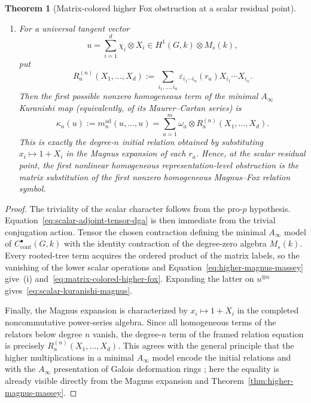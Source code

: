 \documentclass[11pt]{article}
\newtheorem{theorem}{Theorem}[section]
\theoremstyle{definition}
\begin{document}
\begin{theorem}[Matrix-colored higher Fox obstruction at a scalar residual point]
\begin{enumerate}[label=\textnormal{(\roman*)}]
\item For a universal tangent vector
\[
 u=\sum_{i=1}^{d}\chi_i\otimes X_i
 \in H^1(G,k)\otimes M_s(k),
\]
put
\begin{equation}\label{eq:matrix-magnus-relation-polynomial}
 R_a^{(n)}(X_1,\ldots,X_d)
 :=
 \sum_{i_1,\ldots,i_n}
 \varepsilon_{i_1\cdots i_n}(r_a)
 X_{i_1}\cdots X_{i_n}.
\end{equation}
Then the first possible nonzero homogeneous term of the minimal
$A_\infty$ Kuranishi map (equivalently, of its Maurer--Cartan series) is
\begin{equation}\label{eq:scalar-kuranishi-magnus}
 \kappa_n(u)
 :=m_n^{\operatorname{ad}}(u,\ldots,u)
 =\sum_{a=1}^{m}\omega_a\otimes
 R_a^{(n)}(X_1,\ldots,X_d).
\end{equation}
This is exactly the degree-$n$ initial relation obtained by substituting
$x_i\mapsto 1+X_i$ in the Magnus expansion of each $r_a$.  Hence, at the
scalar residual point, the first nonlinear homogeneous representation-level
obstruction is the matrix substitution of the first nonzero homogeneous
Magnus--Fox relation symbol.
\end{enumerate}
\end{theorem}

\begin{proof}
The triviality of the scalar character follows from the pro-$p$ hypothesis.
Equation~\eqref{eq:scalar-adjoint-tensor-dga} is then immediate from the
trivial conjugation action.  Tensor the chosen contraction defining the
minimal $A_\infty$ model of $C^\bullet_{\mathrm{cont}}(G,k)$ with the
identity contraction of the degree-zero algebra $M_s(k)$.  Every rooted-tree
term acquires the ordered product of the matrix labels, so the vanishing of
the lower scalar operations and Equation~\eqref{eq:higher-magnus-massey}
give~(i) and~\eqref{eq:matrix-colored-higher-fox}.  Expanding the latter on
$u^{\otimes n}$ gives~\eqref{eq:scalar-kuranishi-magnus}.

Finally, the Magnus expansion is characterized by $x_i\mapsto1+X_i$ in the
completed noncommutative power-series algebra.  Since all homogeneous terms of
the relators below degree $n$ vanish, the degree-$n$ term of the framed
relation equation is precisely
$R_a^{(n)}(X_1,\ldots,X_d)$.  This agrees with the general principle that the
higher multiplications in a minimal $A_\infty$ model encode the initial
relations and with the $A_\infty$ presentation of Galois deformation rings
\cite{WangErickson}; here the equality is already visible directly from the
Magnus expansion and Theorem~\ref{thm:higher-magnus-massey}.
\end{proof}
\end{document}

